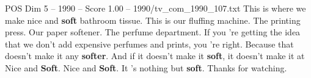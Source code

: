\begin{textsample}{POS Dim 5 – 1990 – Score 1.00 – 1990/tv\_com\_1990\_107.txt}  \label{ex:f5_pos_028}
This is where we make nice and \textbf{soft} bathroom tissue.
This is our fluffing machine.
The printing press.
Our paper softener.
The perfume department.
If you 're getting the idea that we don't add expensive perfumes and prints, you 're right.
Because that doesn't make it any \textbf{softer}.
And if it doesn't make it \textbf{soft}, it doesn't make it at Nice and \textbf{Soft}.
Nice and \textbf{Soft}.
It 's nothing but \textbf{soft}.
Thanks for watching.

\end{textsample}
